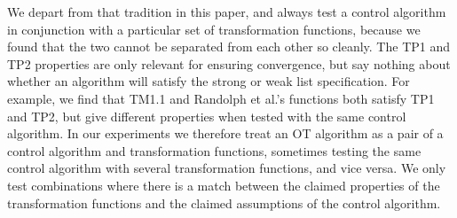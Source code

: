 \documentclass[sigplan,10pt,review,anonymous]{acmart}
\begin{document}
We depart from that tradition in this paper, and always test a control algorithm in conjunction with a particular set of transformation functions, because we found that the two cannot be separated from each other so cleanly.
The TP1 and TP2 properties are only relevant for ensuring convergence, but say nothing about whether an algorithm will satisfy the strong or weak list specification.
For example, we find that TM1.1 \cite{Sun2017} and Randolph et al.'s functions \cite{Randolph2015} both satisfy TP1 and TP2, but give different properties when tested with the same control algorithm.
In our experiments we therefore treat an OT algorithm as a pair of a control algorithm and transformation functions, sometimes testing the same control algorithm with several transformation functions, and vice versa.
We only test combinations where there is a match between the claimed properties of the transformation functions and the claimed assumptions of the control algorithm.
\end{document}
